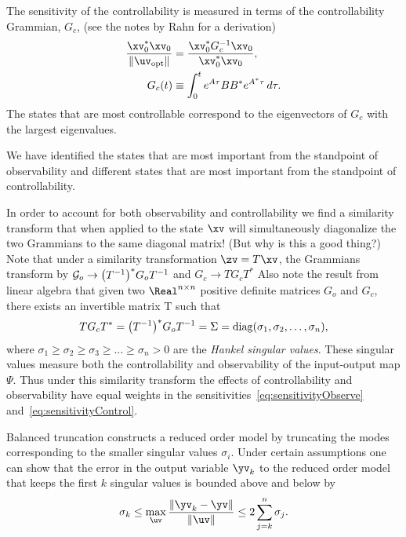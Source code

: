 The sensitivity of the controllability is measured in terms of the 
controllability Grammian, $G_c$, (see the notes by Rahn for a derivation)
\begin{align}
  \frac{\xv_0^*\xv_0}{\| \uv_{\rm opt}\|}   &=  \frac{\xv_0^* G_c^{-1} \xv_0}{\xv_0^*\xv_0}, \label{eq:sensitivityControl} \\
    G_c(t) &\equiv \int_0^t e^{A \tau} B B^* e^{A^*\tau} \,d\tau . 
\end{align}
The states that are most controllable correspond to the eigenvectors of $G_c$ with the
largest eigenvalues.

We have identified the states that are most important from the standpoint
of observability and different states that are most important from the standpoint of controllability. 

In order to account for both observability and 
controllability we find a similarity transform that when applied to the state $\xv$ will simultaneously
diagonalize the two Grammians to the same diagonal matrix! (But why is this a good thing?)
Note that under a similarity transformation $\zv= T\xv$, the Grammians transform
by ${\mathcal G}_o \rightarrow \big(T^{-1}\big)^* G_o T^{-1}$ and $G_c \rightarrow T G_c T^*$
Also note the result from linear algebra that 
given two $\Real^{n\times n}$ positive definite matrices $G_o$ and $G_c$, there exists
an invertible matrix T such that
\begin{align}
   T G_c T^* = \big(T^{-1}\big)^* G_o T^{-1} = \Sigma = {\rm diag}(\sigma_1,\sigma_2,\ldots,\sigma_n),
\end{align}
where $\sigma_1\ge \sigma_2\ge \sigma_3\ge \ldots \ge \sigma_n>0$ are the {\em Hankel singular values}.
These singular values measure both the controllability and observability of the
input-output map $\Psi$. 
Thus under this similarity transform the effects of controllability and
observability have equal weights in the sensitivities~\ref{eq:sensitivityObserve} and~\ref{eq:sensitivityControl}. 



Balanced truncation constructs a reduced order model by truncating the modes
corresponding to the smaller singular values $\sigma_i$. 
Under certain assumptions one can show that the error in the output variable $\yv_k$
to the reduced order model that keeps the first $k$ singular values is bounded
above and below by
\begin{align}
   \sigma_k \le \max_{\uv} \frac{\| \yv_k - \yv \|}{\| \uv \|} \le 2 \sum_{j=k}^n \sigma_j  .
\end{align}

